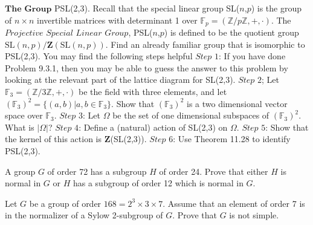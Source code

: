 \documentclass[12pt,letterpaper,boxed]{hmcpset}
\begin{document}

\begin{problem}[11.5.13]
$\textbf{The Group}$ PSL(2,3). Recall that the special linear group SL($n$,$p$) is the group of $n \times n$ invertible matrices with determinant 1 over $\mathbb{F}_p = (\mathbb{Z}/p\mathbb{Z}, +, \cdot)$. The $\textit{Projective Special Linear Group}$, PSL($n$,$p$) is defined to be the quotient group $\text{SL}(n,p)/\textbf{Z}(\text{SL}(n,p))$. Find an already familiar group that is isomorphic to PSL(2,3).
\newline You may find the following steps helpful
\newline
$\textit{Step 1}$: If you have done Problem 9.3.1, then you may be able to guess the answer to this problem by looking at the relevant part of the lattice diagram for SL(2,3).
\newline
$\textit{Step 2}$; Let $\mathbb{F}_3 = (\mathbb{Z}/3\mathbb{Z},+,\cdot)$ be the field with three elements, and let $(\mathbb{F}_3)^2 = \{(a,b) \vert a,b \in \mathbb{F}_3 \}$. Show that $(\mathbb{F}_3)^2$ is a two dimensional vector space over $\mathbb{F}_3$.
\newline
$\textit{Step 3}$: Let $\Omega$ be the set of one dimensional subspaces of $(\mathbb{F}_3)^2$. What is $\vert \Omega \vert$?
\newline
$\textit{Step 4}$: Define a (natural) action of SL(2,3) on $\Omega$.
\newline
$\textit{Step 5}$: Show that the kernel of this action is $\textbf{Z}$(SL(2,3)).
\newline
$\textit{Step 6}$: Use Theorem 11.28 to identify PSL(2,3).
\end{problem}

\begin{solution}
\end{solution}

\clearpage

\begin{problem}[12.2.4]
A group $G$ of order 72 has a subgroup $H$ of order 24. Prove that either $H$ is normal in $G$ or $H$ has a subgroup of order 12 which is normal in $G$.
\end{problem}

\begin{solution}
\end{solution}

\clearpage

\begin{problem}[12.2.8]
Let $G$ be a group of order $168 = 2^3 \times 3 \times 7$. Assume that an element of order 7 is in the normalizer of a Sylow 2-subgroup of $G$. Prove that $G$ is not simple. 
\end{problem}
\end{document}

